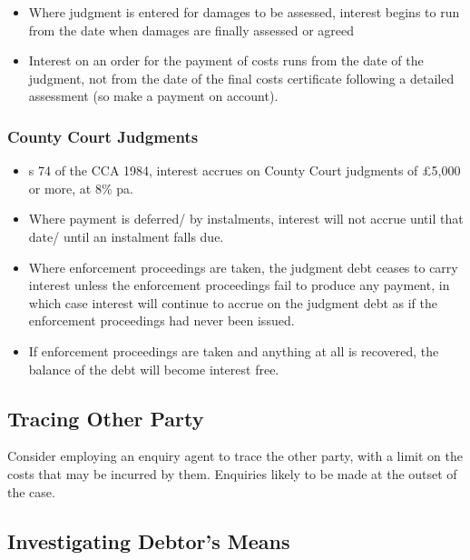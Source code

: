 \documentclass[
]{article}
\providecommand{\tightlist}{%
  \setlength{\itemsep}{0pt}\setlength{\parskip}{0pt}}
\begin{document}
\begin{itemize}
\tightlist
\item
  Where judgment is entered for damages to be assessed, interest begins
  to run from the date when damages are finally assessed or agreed
\item
  Interest on an order for the payment of costs runs from the date of
  the judgment, not from the date of the final costs certificate
  following a detailed assessment (so make a payment on account).
\end{itemize}

\hypertarget{county-court-judgments}{%
\subsubsection{County Court Judgments}\label{county-court-judgments}}

\begin{itemize}
\tightlist
\item
  s 74 of the CCA 1984, interest accrues on County Court judgments of
  £5,000 or more, at 8\% pa.
\item
  Where payment is deferred/ by instalments, interest will not accrue
  until that date/ until an instalment falls due.
\item
  Where enforcement proceedings are taken, the judgment debt ceases to
  carry interest unless the enforcement proceedings fail to produce any
  payment, in which case interest will continue to accrue on the
  judgment debt as if the enforcement proceedings had never been issued.
\item
  If enforcement proceedings are taken and anything at all is recovered,
  the balance of the debt will become interest free.
\end{itemize}

\hypertarget{tracing-other-party}{%
\subsection{Tracing Other Party}\label{tracing-other-party}}

Consider employing an enquiry agent to trace the other party, with a
limit on the costs that may be incurred by them. Enquiries likely to be
made at the outset of the case.

\hypertarget{investigating-debtors-means}{%
\subsection{Investigating Debtor's
Means}\label{investigating-debtors-means}}
\end{document}
